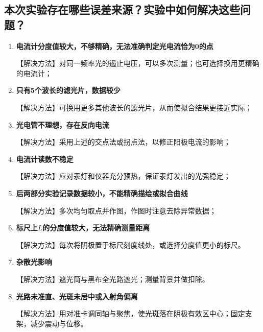 \documentclass[]{../../templates/Report}%
\begin{document}
\begin{fullreportonly}
\subsection{本次实验存在哪些误差来源？实验中如何解决这些问题？}
\begin{enumerate}
    \item \textbf{电流计分度值较大，不够精确，无法准确判定光电流恰为0的点}
    
    【解决方法】对同一频率光的遏止电压，可以多次测量；也可选择换用更精确的电流计；
    \item \textbf{只有5个波长的滤光片，数据较少}
    
    【解决方法】可换用更多其他波长的滤光片，从而使拟合结果更接近实际；
    \item \textbf{光电管不理想，存在反向电流}

    【解决方法】采用上述的交点法或拐点法，以修正阳极电流的影响；
    \item \textbf{电流计读数不稳定}

    【解决方法】应对汞灯和仪器充分预热，保证汞灯发出的光强稳定；
    \item \textbf{后两部分实验记录数据较小，不能精确描绘或拟合曲线}

    【解决方法】多次均匀取点并作图，作图时注意去除异常数据；
    \item \textbf{标尺上$L$的分度值较大，无法精确测量距离}
    
    【解决方法】每次将阴极置于标尺刻度线处，或选择分度值更小的标尺。
    \item \textbf{杂散光影响}
    
    【解决方法】遮光筒与黑布全光路遮光；测量背景并做扣除。
    \item \textbf{光路未准直、光斑未居中或入射角偏离}
    
    【解决方法】用对准卡调同轴与聚焦，使光斑落在阴极有效区中心；固定支架，减少震动与位移。

\end{enumerate}


\end{fullreportonly}
\insertnotes
\end{document}
